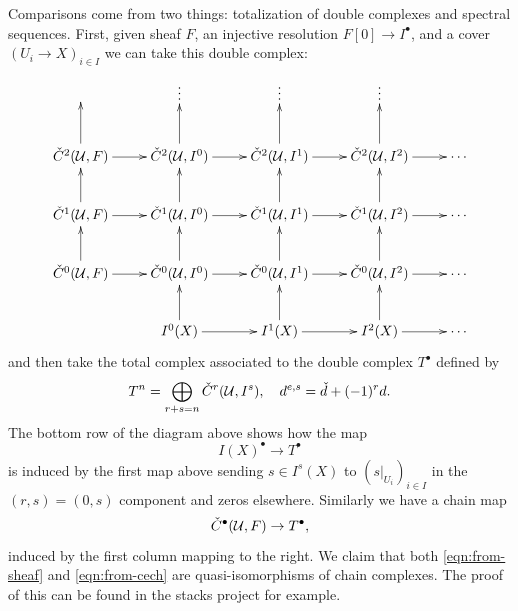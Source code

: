 \documentclass[12pt]{article}
\numberwithin{equation}{section}
\theoremstyle{definition}
\theoremstyle{remark}
\newcommand{\Ucal}{\mathcal{U}}
\newcommand{\Hv}{\Check{H}}
\newcommand{\Cv}{\Check{C}}
\newcommand{\taylor}[1]{{\color{blue} \sf $\spadesuit\spadesuit\spadesuit$ Taylor: [#1]}}
\begin{document}
Comparisons come from two things: totalization of double complexes and spectral sequences.
First, given sheaf $F$, an injective resolution $F[0] \to I^{\bullet}$, and a cover $(U_i\to X)_{i\in I}$ we can take this double complex:
$$
\xymatrix{
	& \vdots & \vdots & \vdots  &  \\
	\Cv^2(\Ucal,F) \ar[u] \ar[r]&\Cv^2(\Ucal,I^0) \ar[r] \ar[u] & \Cv^2(\Ucal,I^1) \ar[r] \ar[u] & \Cv^2(\Ucal,I^2) \ar[r]  \ar[u] & \cdots \\
	\Cv^1(\Ucal,F) \ar[u] \ar[r] &\Cv^1(\Ucal,I^0) \ar[r] \ar[u] & \Cv^1(\Ucal,I^1) \ar[r] \ar[u] & \Cv^1(\Ucal,I^2) \ar[r] \ar[u] & \cdots \\
	\Cv^0(\Ucal,F) \ar[u] \ar[r]&\Cv^0(\Ucal,I^0) \ar[r] \ar[u] & \Cv^0(\Ucal,I^1) \ar[r] \ar[u] & \Cv^0(\Ucal,I^2) \ar[r] \ar[u] & \cdots \\
	&I^0(X) \ar[r] \ar[u] & I^1(X) \ar[r] \ar[u] & I^2(X) \ar[r] \ar[u] & \cdots \\
}$$
and then take the total complex associated to the double complex $T^{\bullet}$ defined by 
 $$ T^n = \bigoplus_{r+s=n}\Cv^r(\Ucal,I^s), \quad d^{e,s} = \Check{d}+(-1)^r d.$$
The bottom row of the diagram above shows how the map 
\begin{equation}\label{eqn:from-sheaf}
I(X)^{\bullet}\to T^{\bullet}
\end{equation}
is induced by the first map above sending $s\in I^s(X)$ to $(s\vert_{U_i})_{i \in I}$ in the $(r,s)=(0,s)$ component and zeros elsewhere. 
Similarly we have a chain map 
\begin{equation}\label{eqn:from-cech}
\Cv^{\bullet}(\Ucal,F) \to T^{\bullet}, 
\end{equation}
induced by the first column mapping to the right. 
We claim that both \eqref{eqn:from-sheaf} and \eqref{eqn:from-cech} are quasi-isomorphisms of chain complexes. 
The proof of this can be found in the stacks project for example.

\end{document}
